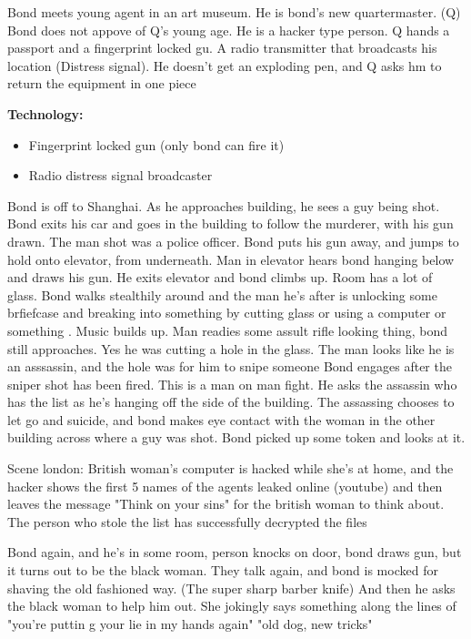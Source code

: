 \documentclass{article}
\begin{document}
    Bond meets young agent in an art museum. He is bond's new quartermaster. (Q)
    Bond does not appove of Q's young age. He is a hacker type person.
    Q hands a passport and a fingerprint locked gu. A radio transmitter that broadcasts
    his location (Distress signal). He doesn't get an exploding pen, and Q asks
    hm to return the equipment in one piece

    \textbf{Technology:}
    \begin{itemize}
      \item Fingerprint locked gun (only bond can fire it)
      \item Radio distress signal broadcaster
    \end{itemize}

    Bond is off to Shanghai. As he approaches building, he sees a guy being shot.
    Bond exits his car and goes in the building to follow the murderer, with his gun drawn.
    The man shot was a police officer. Bond puts his gun away, and jumps to hold onto elevator,
    from underneath. Man in elevator hears bond hanging below and draws his gun.
    He exits elevator and bond climbs up. Room has a lot of glass. Bond walks stealthily around
    and the man he's after is unlocking some brfiefcase and breaking into something by cutting glass
    or using a computer or something
    . Music builds up.
    Man readies some assult rifle looking thing, bond still approaches.
    Yes he was cutting a hole in the glass.
    The man looks like he is an asssassin, and the hole was for him to
    snipe someone
    Bond engages after the sniper shot has been fired. This is a man on man fight.
    He asks the assassin who has the list as he's hanging off the side of the building.
    The assassing chooses to let go and suicide, and bond makes eye contact with the woman in
    the other building across where a guy was shot. Bond picked up some token and looks at it.

    Scene london:
    British woman's computer is hacked while she's at home, and the hacker
    shows the first 5 names of the agents leaked online (youtube) and then leaves
    the message "Think on your sins" for the british woman to think about.
    The person who stole the list has successfully decrypted the files

    Bond again, and he's in some room, person knocks on door, bond draws gun, but it turns out
    to be the black woman. They talk again, and bond is mocked for shaving the old fashioned way.
    (The super sharp barber knife) And then he asks the black woman to help him out.
    She jokingly says something along the lines of "you're puttin g your lie in my hands again"
    "old dog, new tricks"
\end{document}
